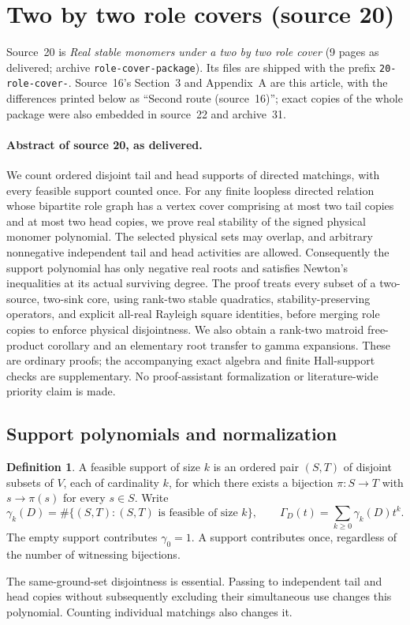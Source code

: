 \documentclass[11pt]{article}
\numberwithin{equation}{section}
\theoremstyle{definition}\newtheorem{definition}[theorem]{Definition}\newtheorem{remark}[theorem]{Remark}
\newcommand{\Ga}{\Gamma}                   %
\begin{document}
\section{Two by two role covers (source 20)}\label{pgr:r:rc:sec}

Source~20 is \emph{Real stable monomers under a two by two role cover}
(9 pages as delivered; archive \texttt{role-cover-package}). Its files are
shipped with the prefix \texttt{20-role-cover-}. Source~16's Section~3 and
Appendix~A are this article, with the differences printed below as
``Second route (source~16)''; exact copies of the whole package were also
embedded in source~22 and archive~31.

\paragraph{Abstract of source 20, as delivered.}

We count ordered disjoint tail and head supports of directed matchings, with every feasible support counted once. For any finite loopless directed relation whose bipartite role graph has a vertex cover comprising at most two tail copies and at most two head copies, we prove real stability of the signed physical monomer polynomial. The selected physical sets may overlap, and arbitrary nonnegative independent tail and head activities are allowed. Consequently the support polynomial has only negative real roots and satisfies Newton's inequalities at its actual surviving degree. The proof treats every subset of a two-source, two-sink core, using rank-two stable quadratics, stability-preserving operators, and explicit all-real Rayleigh square identities, before merging role copies to enforce physical disjointness. We also obtain a rank-two matroid free-product corollary and an elementary root transfer to gamma expansions. These are ordinary proofs; the accompanying exact algebra and finite Hall-support checks are supplementary. No proof-assistant formalization or literature-wide priority claim is made.

\subsection{Support polynomials and normalization}
\begin{definition}
A feasible support of size $k$ is an ordered pair $(S,T)$ of disjoint subsets of $V$, each of cardinality $k$, for which there exists a bijection $\pi:S\to T$ with $s\to\pi(s)$ for every $s\in S$. Write
\[
 \gamma_k(D)=\#\{(S,T): (S,T)\text{ is feasible of size }k\},\qquad
 \Ga_D(t)=\sum_{k\ge0}\gamma_k(D)t^k.
\]
The empty support contributes $\gamma_0=1$. A support contributes once, regardless of the number of witnessing bijections.
\end{definition}
The same-ground-set disjointness is essential. Passing to independent tail and head copies without subsequently excluding their simultaneous use changes this polynomial. Counting individual matchings also changes it.
\end{document}
